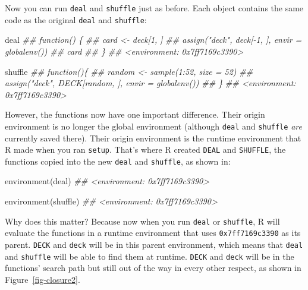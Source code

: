 \documentclass[
  letterpaper,
  DIV=11,
  numbers=noendperiod]{scrbook}
\newenvironment{Shaded}{\begin{snugshade}}{\end{snugshade}}
\newcommand{\DocumentationTok}[1]{\textcolor[rgb]{0.37,0.37,0.37}{\textit{#1}}}
\newcommand{\FunctionTok}[1]{\textcolor[rgb]{0.28,0.35,0.67}{#1}}
\newcommand{\NormalTok}[1]{\textcolor[rgb]{0.00,0.23,0.31}{#1}}
\begin{document}
Now you can run \texttt{deal} and \texttt{shuffle} just as before. Each
object contains the same code as the original \texttt{deal} and
\texttt{shuffle}:

\begin{Shaded}
\begin{Highlighting}[]
\NormalTok{deal}
\DocumentationTok{\#\# function() \{}
\DocumentationTok{\#\#     card \textless{}{-} deck[1, ]}
\DocumentationTok{\#\#     assign("deck", deck[{-}1, ], envir = globalenv())}
\DocumentationTok{\#\#     card}
\DocumentationTok{\#\#   \}}
\DocumentationTok{\#\# \textless{}environment: 0x7ff7169c3390\textgreater{}}

\NormalTok{shuffle}
\DocumentationTok{\#\# function()\{}
\DocumentationTok{\#\#     random \textless{}{-} sample(1:52, size = 52)}
\DocumentationTok{\#\#     assign("deck", DECK[random, ], envir = globalenv())}
\DocumentationTok{\#\#  \}}
\DocumentationTok{\#\# \textless{}environment: 0x7ff7169c3390\textgreater{}}
\end{Highlighting}
\end{Shaded}

However, the functions now have one important difference. Their origin
environment is no longer the global environment (although \texttt{deal}
and \texttt{shuffle} \emph{are} currently saved there). Their origin
environment is the runtime environment that R made when you ran
\texttt{setup}. That's where R created \texttt{DEAL} and
\texttt{SHUFFLE}, the functions copied into the new \texttt{deal} and
\texttt{shuffle}, as shown in:

\begin{Shaded}
\begin{Highlighting}[]
\FunctionTok{environment}\NormalTok{(deal)}
\DocumentationTok{\#\# \textless{}environment: 0x7ff7169c3390\textgreater{}}

\FunctionTok{environment}\NormalTok{(shuffle)}
\DocumentationTok{\#\# \textless{}environment: 0x7ff7169c3390\textgreater{}}
\end{Highlighting}
\end{Shaded}

Why does this matter? Because now when you run \texttt{deal} or
\texttt{shuffle}, R will evaluate the functions in a runtime environment
that uses \texttt{0x7ff7169c3390} as its parent. \texttt{DECK} and
\texttt{deck} will be in this parent environment, which means that
\texttt{deal} and \texttt{shuffle} will be able to find them at runtime.
\texttt{DECK} and \texttt{deck} will be in the functions' search path
but still out of the way in every other respect, as shown in
Figure~\ref{fig-closure2}.
\end{document}
